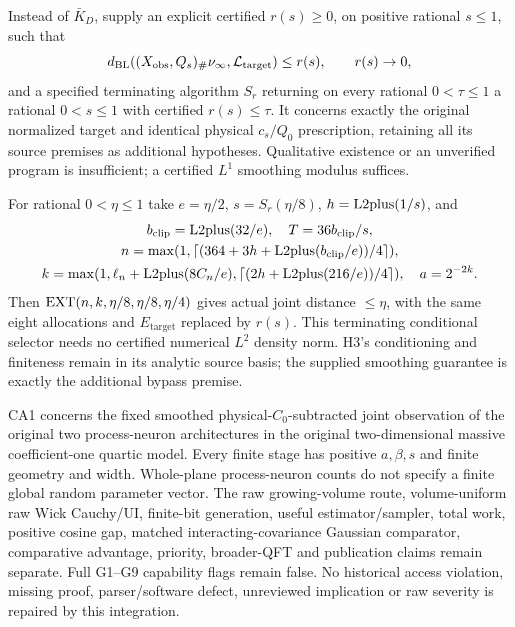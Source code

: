 \begin{theorem}\label{cm:bypass}
Instead of $\bar K_D$, supply an explicit certified $r(s)\ge0$, on
positive rational $s\le1$, such that
\[
 d_{\mathrm{BL}}((X_{\mathrm{obs}},Q_s)_\#\nu_\infty,\mathcal L_{\mathrm{target}})
 \le r(s),\qquad r(s)\to0,
\]
and a specified terminating algorithm $S_r$ returning on every rational
$0<\tau\le1$ a rational $0<s\le1$ with certified $r(s)\le\tau$.
It concerns exactly the original normalized target and identical physical
$c_s/Q_0$ prescription, retaining all its source premises as additional
hypotheses. Qualitative existence or an unverified program is insufficient;
a certified $L^1$ smoothing modulus suffices.

For rational $0<\eta\le1$ take $e=\eta/2$, $s=S_r(\eta/8)$,
$h=\operatorname{L2plus}(1/s)$, and
\begin{gather*}
 b_{\mathrm{clip}}=\operatorname{L2plus}(32/e),\quad T=36b_{\mathrm{clip}}/s,\\
 n=\max(1,\lceil(364+3h+\operatorname{L2plus}(b_{\mathrm{clip}}/e))/4\rceil),\\
 k=\max(1,\ell_n+\operatorname{L2plus}(8C_n/e),
              \lceil(2h+\operatorname{L2plus}(216/e))/4\rceil),\quad a=2^{-2k}.
\end{gather*}
Then $\operatorname{EXT}(n,k,\eta/8,\eta/8,\eta/4)$ gives actual joint distance
$\le\eta$, with the same eight allocations and $E_{\mathrm{target}}$
replaced by $r(s)$. This terminating conditional selector needs no certified
numerical $L^2$ density norm. H3's conditioning and finiteness remain
in its analytic source basis; the supplied smoothing guarantee is exactly
the additional bypass premise.
\end{theorem}

\begin{remark}\label{cm:limits}
CA1 concerns the fixed smoothed physical-$C_0$-subtracted joint observation
of the original two process-neuron architectures in the original
two-dimensional massive coefficient-one quartic model. Every finite stage
has positive $a,\beta,s$ and finite geometry and width. Whole-plane
process-neuron counts do not specify a finite global random parameter vector.
The raw growing-volume route, volume-uniform raw Wick Cauchy/UI, finite-bit
generation, useful estimator/sampler, total work, positive cosine gap,
matched interacting-covariance Gaussian comparator, comparative advantage,
priority, broader-QFT and publication claims remain separate. Full G1--G9
capability flags remain false. No historical access violation, missing
proof, parser/software defect, unreviewed implication or raw severity is
repaired by this integration.
\end{remark}

